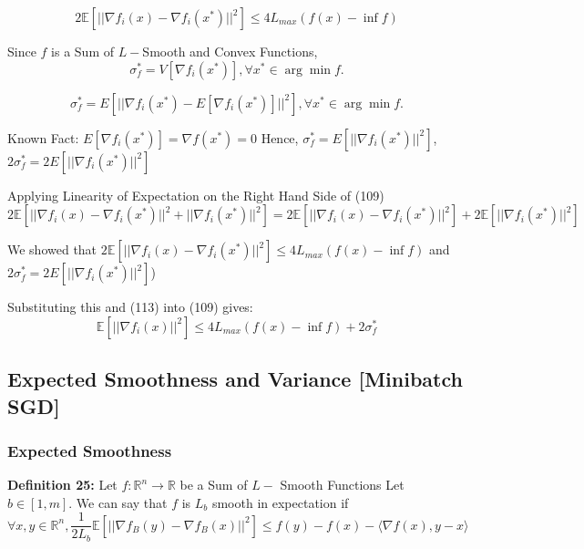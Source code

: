 \begin{equation}
    2\mathbb{E}[||\nabla f_i(x) - \nabla f_i(x^*)||^2] \leq 4L_{max} (f(x) - \inf f)
\end{equation}

\noindent  Since $f$ is a Sum of $L-$Smooth and Convex Functions,
\begin{equation}
    \sigma_f^* = V[\nabla f_i(x^*)], \forall x^* \in \arg \min f.
\end{equation}

\begin{equation}
    \sigma_f^* = E[||\nabla f_i(x^*) - E[\nabla f_i(x^*)]||^2], \forall x^* \in \arg \min f.
\end{equation}

\noindent Known Fact: $E[\nabla f_i(x^*)] = \nabla f(x^*) = 0$ \newline  
\noindent Hence, $\sigma_f^* = E[||\nabla f_i(x^*)||^2]$, $2 \sigma_f^* = 2 E[||\nabla f_i(x^*)||^2]$ \newline 

\noindent  Applying Linearity of Expectation on the Right Hand Side of (109)
\begin{equation}
    2\mathbb{E} [||\nabla f_i(x) - \nabla f_i(x^*)||^2 + ||\nabla f_i(x^*)||^2] = 2\mathbb{E} [||\nabla f_i(x) - \nabla f_i(x^*)||^2] + 2 \mathbb{E}  [||\nabla f_i(x^*)||^2]
\end{equation}

\noindent  We showed that $2\mathbb{E}[||\nabla f_i(x) - \nabla f_i(x^*)||^2] \leq 4L_{max} (f(x) - \inf f)$ and $2 \sigma_f^* = 2 E[||\nabla f_i(x^*)||^2]$) \newline 

\noindent Substituting this and (113) into (109) gives: 
\begin{equation}
    \mathbb{E}[||\nabla f_i(x)||^2] \leq 4L_{max} (f(x) - \inf f) + 2 \sigma_f^*
\end{equation}

\subsection{Expected Smoothness and Variance [Minibatch SGD]}
\subsubsection{Expected Smoothness}
\noindent \textbf{Definition 25:} Let $f: \mathbb{R}^n \rightarrow \mathbb{R}$ be a Sum of $L-$ Smooth Functions Let $b \in [1, m]$. We can say that $f$ is $L_b$ smooth in expectation if 
\begin{equation}
    \forall x, y \in \mathbb{R}^n, \frac{1}{2L_b} \mathbb{E}[||\nabla f_B(y) - \nabla f_B(x)||^2] \leq f(y) - f(x) - \langle \nabla f(x), y - x \rangle
\end{equation}

